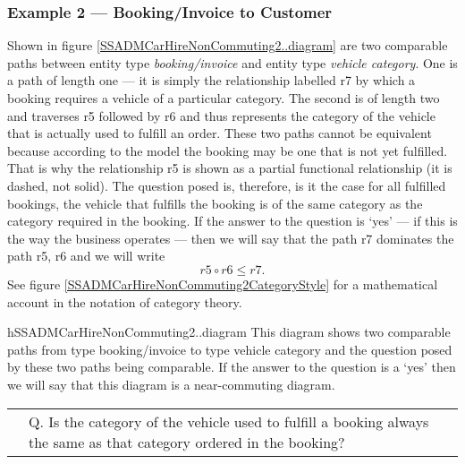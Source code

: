 \subsubsection{Example 2 --- Booking/Invoice to Customer}
\mynote
Shown in figure \ref{SSADMCarHireNonCommuting2..diagram} are two comparable paths between entity type \textit{booking/invoice} and
entity type \textit{vehicle category}. One is a path of length one --- it is simply the relationship labelled r7 by which a booking requires a vehicle of a particular category.
The second is of length two and traverses r5 followed by r6 and thus represents the category of the vehicle that is actually used to fulfill an order. These two paths cannot be equivalent because according to the model the booking may be one that is not yet fulfilled. That is why the relationship r5 is shown as a partial functional relationship (it is dashed, not solid). The question posed is, therefore, is it the case for all fulfilled bookings, the vehicle that fulfills the booking is of the same category as the category required in the booking. If the answer to the question is `yes' --- if this is the way the business operates --- then we will say that the path r7 dominates the path r5, r6 and we will write 
\begin{equation*}
r5 \circ r6 \leq r7.
\end{equation*} 
See figure \ref{SSADMCarHireNonCommuting2CategoryStyle} for a mathematical account in the notation of category theory.

\begin{erboxedFigure}{h}{SSADMCarHireNonCommuting2..diagram}
{
This diagram  shows two comparable paths from type booking/invoice to type vehicle category and the question posed by these two paths being comparable. 
If the answer to the question is a `yes' then we will say that this diagram is a near-commuting diagram.}
\begin{tabular}{c  p{4.0cm}}
\raisebox{-1.8cm}{\scalebox{0.9}
{}}
&
Q. Is the category of the vehicle used to fulfill a booking always
the same as that category ordered in the booking?\\[0.2cm]
\end{tabular} 
\end{erboxedFigure}


